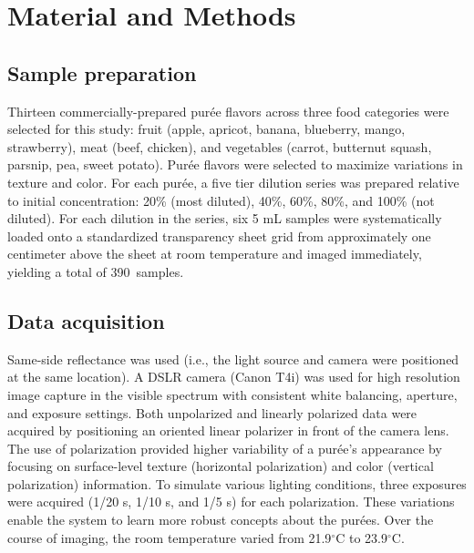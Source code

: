 \documentclass[authoryear]{elsarticle}
\begin{document}
\section{Material and Methods}
\label{sec:Materials and Methods}
\setcounter{secnumdepth}{3}\subsection{Sample preparation}\label{ssec:Sample prep}
Thirteen commercially-prepared pur\' ee flavors across three food categories were selected for this study: fruit (apple, apricot, banana, blueberry, mango, strawberry), meat (beef, chicken), and vegetables (carrot, butternut squash, parsnip, pea, sweet potato). Pur\' ee flavors were selected to maximize variations in texture and color. For each pur\' ee, a five tier dilution series was prepared relative to initial concentration: 20\% (most diluted), 40\%, 60\%, 80\%, and 100\% (not diluted). For each dilution in the series, six 5 mL samples were systematically loaded onto a standardized transparency sheet grid from approximately one centimeter above the sheet at room temperature and imaged immediately, yielding a total of 390~samples.

\subsection{Data acquisition}\label{ssec:Data acquisition}
Same-side reflectance was used (i.e., the light source and camera were positioned at the same location). A DSLR camera (Canon T4i) was used for high resolution image capture in the visible spectrum with consistent white balancing, aperture, and exposure settings. Both unpolarized and linearly polarized data were acquired by positioning an oriented linear polarizer in front of the camera lens. The use of polarization provided higher variability of a pur\' ee's appearance by focusing on surface-level texture (horizontal polarization) and color (vertical polarization) information. To simulate various lighting conditions, three exposures were acquired (1/20 s, 1/10 s, and 1/5 s) for each polarization. These variations enable the system to learn more robust concepts about the pur\' ees. Over the course of imaging, the room temperature varied from 21.9$^{\circ}$C to 23.9$^{\circ}$C.
\end{document}

